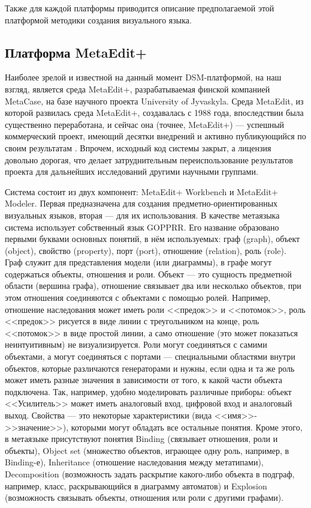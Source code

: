 Также для каждой платформы приводится описание предполагаемой этой платформой методики
создания визуального языка.

\subsection{Платформа MetaEdit+}
Наиболее зрелой и известной на данный момент \ac{DSM}-платформой, на наш взгляд, является среда MetaEdit+, 
разрабатываемая финской компанией MetaCase, на базе научного проекта University of Jyvaskyla. 
Среда MetaEdit, из которой развилась среда MetaEdit+, создавалась с 1988 года, впоследствии 
была существенно переработана, и сейчас она (точнее, MetaEdit+) --- успешный коммерческий проект, 
имеющий десятки внедрений и активно публикующийся по своим результатам \cite{kelly2008domain, luoma2004defining, tolvanen2007advanced, tolvanen2009metaedit}. 
Впрочем, исходный код системы закрыт, а лицензия довольно дорогая, что делает затруднительным 
переиспользование результатов проекта для дальнейших исследований другими научными группами.

Система состоит из двух компонент: MetaEdit+ Workbench и MetaEdit+ Modeler. Первая 
предназначена для создания предметно-ориентированных визуальных языков, вторая --- для 
их использования. В качестве метаязыка система использует собственный язык GOPPRR. 
Его название образовано первыми буквами основных понятий, в нём используемых: граф (graph), 
объект (object), свойство (property), порт (port), отношение (relation), роль (role). 
Граф служит для представления модели (или диаграммы), в графе могут содержаться объекты, 
отношения и роли. Объект --- это сущность предметной области (вершина графа), отношение 
связывает два или несколько объектов, при этом отношения соединяются с объектами с помощью ролей. 
Например, отношение наследования может иметь роли <<предок>> и <<потомок>>, роль <<предок>> 
рисуется в виде линии с треугольником на конце, роль <<потомок>> в виде простой линии, 
а само отношение (это может показаться неинтуитивным) не визуализируется. Роли могут 
соединяться с самими объектами, а могут соединяться с портами --- специальными областями 
внутри объектов, которые различаются генераторами и нужны, если одна и та же роль может 
иметь разные значения в зависимости от того, к какой части объекта подключена. Так, 
например, удобно моделировать различные приборы: объект <<Усилитель>> может иметь аналоговый 
вход, цифровой вход и аналоговый выход. Свойства --- это некоторые характеристики 
(вида <<имя>>->>значение>>), которыми могут обладать все остальные понятия. Кроме 
этого, в метаязыке присутствуют понятия Binding (связывает отношения, роли и объекты),
Object set (множество объектов, играющее одну роль, например, в Binding-е), Inheritance 
(отношение наследования между метатипами), Decomposition (возможность задать раскрытие 
какого-либо объекта в подграф, например, класс, раскрывающийся в диаграмму автоматов) и 
Explosion (возможность связывать объекты, отношения или роли с другими графами).

